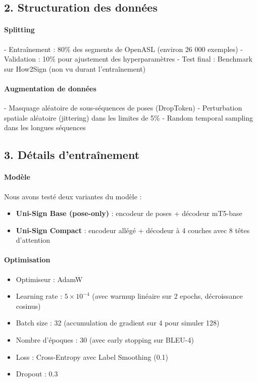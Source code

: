 \subsection*{2. Structuration des données}

\paragraph{Splitting}

- Entraînement : 80\% des segments de OpenASL (environ 26 000 exemples)
- Validation : 10\% pour ajustement des hyperparamètres
- Test final : Benchmark sur How2Sign (non vu durant l’entraînement)

\paragraph{Augmentation de données}

- Masquage aléatoire de sous-séquences de poses (DropToken)
- Perturbation spatiale aléatoire (jittering) dans les limites de 5\%
- Random temporal sampling dans les longues séquences

\subsection*{3. Détails d’entraînement}

\paragraph{Modèle}

Nous avons testé deux variantes du modèle :
\begin{itemize}
    \item \textbf{Uni-Sign Base (pose-only)} : encodeur de poses + décodeur mT5-base
    \item \textbf{Uni-Sign Compact} : encodeur allégé + décodeur à 4 couches avec 8 têtes d’attention
\end{itemize}

\paragraph{Optimisation}

\begin{itemize}
    \item Optimiseur : AdamW
    \item Learning rate : $5 \times 10^{-4}$ (avec warmup linéaire sur 2 epochs, décroissance cosinus)
    \item Batch size : 32 (accumulation de gradient sur 4 pour simuler 128)
    \item Nombre d’époques : 30 (avec early stopping sur BLEU-4)
    \item Loss : Cross-Entropy avec Label Smoothing (0.1)
    \item Dropout : 0.3
\end{itemize}


